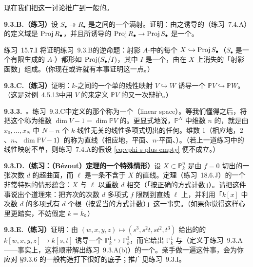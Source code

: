 现在我们把这一讨论推广到一般的\trProjectiveScheme。

\textbf{9.3.B.（练习）}\quad 设 $S_\bullet\twoheadrightarrow R_\bullet$ 是\trGradedRing{}之间的一个满射。证明：由之诱导的\trMorphism（\mbox{练习~7.4.A}）的定义域是 $\operatorname{Proj} R_\bullet$，并且所诱导的\trMorphism{} $\operatorname{Proj} R_\bullet\to\operatorname{Proj} S_\bullet$ 是一个\trClosedEmbedding。

\mbox{练习~15.7.I} 将证明\mbox{练习~9.3.B}的逆命题：射影 $A$-\trScheme{}中的每个\trClosedEmbedding{} $X\hookrightarrow\operatorname{Proj} S_\bullet$（$S_\bullet$ 是一个有限生成的\trGrading{} $A$-\trAlgebra）都形如 $\operatorname{Proj}(S_\bullet/I)$，其中 $I$ 是一个\trHomogeneous\trIdeal，由在 $X$ 上消失的「射影函数」组成。（你现在或许就有本事证明这一点。）

\textbf{9.3.C.（练习）}\quad 证明：$k$-\trVectorSpace{}之间的一个单的线性映射 $V\hookrightarrow W$ 诱导一个\trClosedEmbedding{} $\mathbb{P}V\hookrightarrow\mathbb{P}W$。（这是对\mbox{例~4.5.13}中用 $V$ 的\trDual{}来定义 $\mathbb{P}V$ 的又一次辩护。）

\textbf{9.3.3.}\ \emph{\trhDefinition{}。}\quad \mbox{练习~9.3.C}中定义的那个\trClosedSubscheme{}称为一个\textbf{\trLinearSpace{}}（linear space）。等我们懂得\trDimension{}之后，将把这个\trClosedSubscheme{}称为维数 $\dim V-1=\dim\mathbb{P}V$ 的\trLinearSpace{}。更显式地说，$\mathbb{P}^N$ 中维数 $n$ 的\trLinearSpace{}，就是由 $x_0,\dots,x_N$ 中 $N-n$ 个 $k$-线性无关的\trHomogeneous{}线性多项式切出的任何\trClosedSubscheme。维数 $1$（相应地，$2$、$n$、$\dim\mathbb{P}V-1$）的\trLinearSpace{}称为直线（相应地，平面、$n$-平面、\trHyperplane）。（若上一道练习中的线性映射不单，则\mbox{练习~7.4.A}的假设 \eqref{eq:vphi-s-plus-empty} 便不成立。）

\textbf{9.3.D.（练习：\trBezout{}（Bézout）定理的一个特殊情形）}\quad 设 $X\subset\mathbb{P}^n_k$ 是由 $f=0$ 切出的一张次数 $d$ 的超曲面，而 $\ell$ 是一条不含于 $X$ 的直线。\trBezout{}定理（\mbox{练习~18.6.J}）的一个非常特殊的情形蕴含：$X$ 与 $\ell$ 以重数 $d$ 相交（「按正确的方式计数」）。请把这件事说出个道理来：把齐次的次数 $d$ 多项式 $f$ 限制到直线 $\ell$ 上，并利用「$k[x]$ 中次数 $d$ 的多项式有 $d$ 个根（按妥当的方式计数）」这一事实。（如果你觉得这样心里更踏实，不妨假定 $k=\overline{k}$。）

\textbf{9.3.E.（练习）}\quad 证明：由 $(w,x,y,z)\mapsto(s^3,s^2t,st^2,t^3)$ 给出的\trGradedRing{}的\trMap{} $k[w,x,y,z]\to k[s,t]$ 诱导一个\trClosedEmbedding{} $\mathbb{P}^1_k\hookrightarrow\mathbb{P}^3_k$，而它给出 $\mathbb{P}^1_k$ 与\trTwistedCubic{}（定义于\mbox{练习~9.3.A}——事实上，这将顺带解出\mbox{练习~9.3.A}(b)）的一个\trIsomorphism。亲手做一遍这件事，会为你应对 \S9.3.6 的一般\trVeronese{}构造打下很好的底子；推广见\mbox{练习~9.3.I}。

